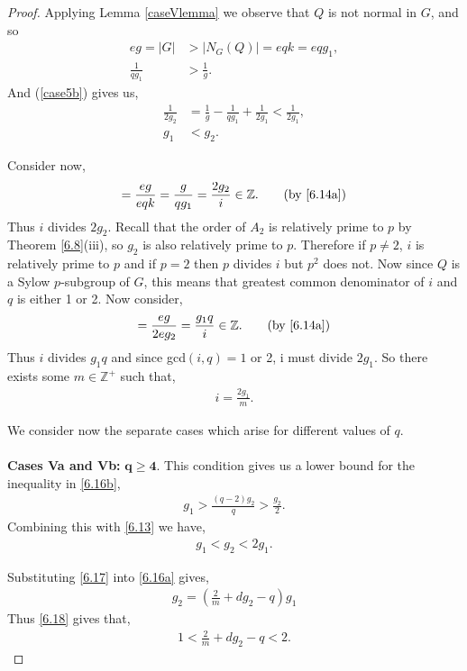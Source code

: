 \begin{proof}
Applying Lemma \ref{caseVlemma} we observe that $Q$ is not normal in $G$, and so 
\begin{align*} eg = |G| &> |N_G(Q)| = eqk = eqg_1, \\[1.5ex]
\frac{1}{qg_1} &> \frac{1}{g}.
\end{align*}
And (\ref{case5b}) gives us,
\begin{align}\label{6.13}  \frac{1}{2g_2} &= \frac{1}{g} - \frac{1}{qg_1} + \frac{1}{2g_1} < \frac{1}{2g_1}, \nonumber
\\[1.5ex] g_1 &< g_2.
\end{align}

Consider now,
\begin{align*} [G : N_G(Q)] = \frac{eg}{e q k} = \frac{g}{q g_1} = \frac{2 g_2}{i} \in \mathbb{Z}. \tag{by \eqref{6.14a}}
\end{align*}
Thus $i$ divides $2 g_2$. Recall that the order of $A_2$ is relatively prime to $p$ by Theorem \ref{6.8}(iii), so $g_2$ is also relatively prime to $p$. Therefore if $p \neq 2$, $i$ is relatively prime to $p$ and if $p=2$ then $p$ divides $i$ but $p^2$ does not. Now since $Q$ is a Sylow $p$-subgroup of $G$, this means that greatest common denominator of $i$ and $q$ is either 1 or 2.
Now consider,
\begin{align*} [G : N_G(A_2)] = \frac{eg}{2 e g_2} = \frac{g_1 q}{i} \in \mathbb{Z}. \tag{by \eqref{6.14a}}
\end{align*}
Thus $i$ divides $g_1 q$ and since gcd$(i, q) = 1$ or 2, i must divide $2 g_1$. So there exists some $m \in \mathbb{Z^+}$ such that,
\begin{align}\label{6.17} i = \frac{2 g_1}{m}.
\end{align}

We consider now the separate cases which arise for different values of $q$. \\
\\
 \space \textbf{Cases Va and Vb:} $\pmb{q \geq 4}$. This condition gives us a lower bound for the inequality in \eqref{6.16b},
\begin{align*} g_1 > \frac{(q-2) g_2}{q} > \frac{g_2}{2}.
\end{align*}
Combining this with \eqref{6.13} we have,
\begin{align}\label{6.18} g_1 < g_2 < 2 g_1.
\end{align}

Substituting \eqref{6.17} into \eqref{6.16a} gives,
\begin{align*} g_2 = \left( \frac{2}{m} + d g_2 - q \right) g_1
\end{align*}
Thus \eqref{6.18} gives that,
\begin{align*} 1 < \frac{2}{m} + d g_2 - q < 2.
\end{align*}


\end{proof}
